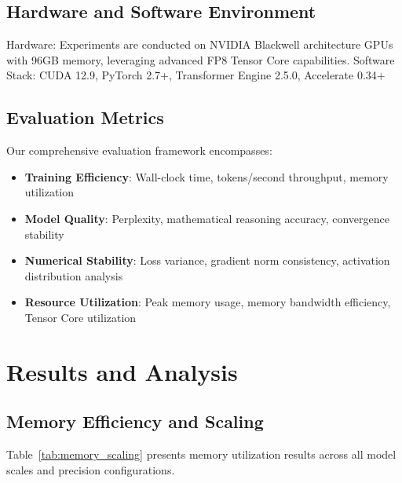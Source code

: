 \documentclass[conference]{IEEEtran}
\begin{document}
\subsection{Hardware and Software Environment}

Hardware: Experiments are conducted on NVIDIA Blackwell architecture GPUs with 96GB memory, leveraging advanced FP8 Tensor Core capabilities.
Software Stack: CUDA 12.9, PyTorch 2.7+, Transformer Engine 2.5.0, Accelerate 0.34+

\subsection{Evaluation Metrics}

Our comprehensive evaluation framework encompasses:

\begin{itemize}
\item \textbf{Training Efficiency}: Wall-clock time, tokens/second throughput, memory utilization
\item \textbf{Model Quality}: Perplexity, mathematical reasoning accuracy, convergence stability
\item \textbf{Numerical Stability}: Loss variance, gradient norm consistency, activation distribution analysis
\item \textbf{Resource Utilization}: Peak memory usage, memory bandwidth efficiency, Tensor Core utilization
\end{itemize}

\section{Results and Analysis}

\subsection{Memory Efficiency and Scaling}

Table~\ref{tab:memory_scaling} presents memory utilization results across all model scales and precision configurations.
\end{document}
